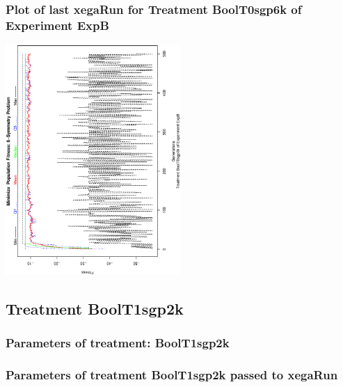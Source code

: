 \documentclass[18pt,c]{beamer}
\makeatletter
\def\beamer@writeslidentry@miniframesoff{%
  \expandafter\beamer@ifempty\expandafter{\beamer@framestartpage}{}%
  {%
   \clearpage\beamer@notesactions%
  }
}
\newcommand*{\miniframesoff}{\let\beamer@writeslidentry=\beamer@writeslidentry@miniframesoff}
\makeatother
\begin{document}
 \begin{frame}
 \frametitle{ Plot of last xegaRun for Treatment BoolT0sgp6k of Experiment ExpB }
 \begin{center}
\includegraphics[width=0.5\textwidth, angle=-90]
{ExpBPlotPopStatsFigure004.eps}
 \end{center}
 \label{report/ExpBPlotPopStatsFigure004.eps}  
 \end{frame}

\miniframesoff
\subsection{Treatment BoolT1sgp2k}

 \begin{frame}
 \fontsize{8pt}{9pt}\selectfont
 \frametitle{  Parameters of treatment: BoolT1sgp2k 
 }

 \label{ExpBtParmTable020.tex}  
 \end{frame}


 \begin{frame}
 \fontsize{8pt}{9pt}\selectfont
 \frametitle{  Parameters of treatment BoolT1sgp2k passed to xegaRun
 }

 \label{ExpBtParmTable021.tex}  
 \end{frame}
\end{document}
